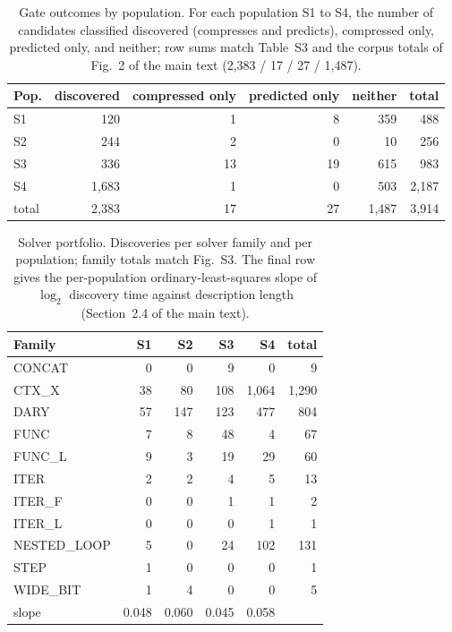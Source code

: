 \begin{table}[!ht]\centering
\caption{Gate outcomes by population. For each population S1 to S4, the number of candidates classified discovered (compresses and predicts), compressed only, predicted only, and neither; row sums match Table~S3 and the corpus totals of Fig.~2 of the main text (2,383 / 17 / 27 / 1,487).}\label{tab:sc1}
\begin{tabular}{lrrrrr}\toprule
Pop. & discovered & compressed only & predicted only & neither & total \\\midrule
S1 & 120 & 1 & 8 & 359 & 488 \\
S2 & 244 & 2 & 0 & 10 & 256 \\
S3 & 336 & 13 & 19 & 615 & 983 \\
S4 & 1,683 & 1 & 0 & 503 & 2,187 \\
\midrule
total & 2,383 & 17 & 27 & 1,487 & 3,914 \\
\bottomrule\end{tabular}\end{table}

\begin{table}[!ht]\centering
\caption{Solver portfolio. Discoveries per solver family and per population; family totals match Fig.~S3. The final row gives the per-population ordinary-least-squares slope of $\log_2$ discovery time against description length (Section~2.4 of the main text).}\label{tab:sc2}
\begin{tabular}{lrrrrr}\toprule
Family & S1 & S2 & S3 & S4 & total \\\midrule
CONCAT & 0 & 0 & 9 & 0 & 9 \\
CTX\_X & 38 & 80 & 108 & 1,064 & 1,290 \\
DARY & 57 & 147 & 123 & 477 & 804 \\
FUNC & 7 & 8 & 48 & 4 & 67 \\
FUNC\_L & 9 & 3 & 19 & 29 & 60 \\
ITER & 2 & 2 & 4 & 5 & 13 \\
ITER\_F & 0 & 0 & 1 & 1 & 2 \\
ITER\_L & 0 & 0 & 0 & 1 & 1 \\
NESTED\_LOOP & 5 & 0 & 24 & 102 & 131 \\
STEP & 1 & 0 & 0 & 0 & 1 \\
WIDE\_BIT & 1 & 4 & 0 & 0 & 5 \\
\midrule
slope & 0.048 & 0.060 & 0.045 & 0.058 & \\
\bottomrule\end{tabular}\end{table}

